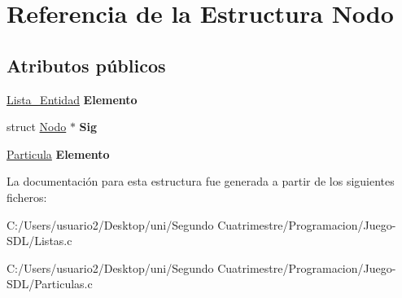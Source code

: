 \hypertarget{struct_nodo}{}\section{Referencia de la Estructura Nodo}
\label{struct_nodo}
\subsection*{Atributos públicos}
\begin{DoxyCompactItemize}
\item 
\hyperlink{_listas_8h_afa1cc0b364973c384d0b054eace88226}{Lista\+\_\+\+Entidad} {\bfseries Elemento}\hypertarget{struct_nodo_aa4681b50b49eeac0e6257b9b507579f6}{}\label{struct_nodo_aa4681b50b49eeac0e6257b9b507579f6}

\item 
struct \hyperlink{struct_nodo}{Nodo} $\ast$ {\bfseries Sig}\hypertarget{struct_nodo_ae7ca239ebecad2c8ad5f88ef5ed9c280}{}\label{struct_nodo_ae7ca239ebecad2c8ad5f88ef5ed9c280}

\item 
\hyperlink{structparticula}{Particula} {\bfseries Elemento}\hypertarget{struct_nodo_a16aab53ddebbe41cd3dbd9ed4eac17fa}{}\label{struct_nodo_a16aab53ddebbe41cd3dbd9ed4eac17fa}

\end{DoxyCompactItemize}


La documentación para esta estructura fue generada a partir de los siguientes ficheros\+:\begin{DoxyCompactItemize}
\item 
C\+:/\+Users/usuario2/\+Desktop/uni/\+Segundo Cuatrimestre/\+Programacion/\+Juego-\/\+S\+D\+L/Listas.\+c\item 
C\+:/\+Users/usuario2/\+Desktop/uni/\+Segundo Cuatrimestre/\+Programacion/\+Juego-\/\+S\+D\+L/Particulas.\+c\end{DoxyCompactItemize}
